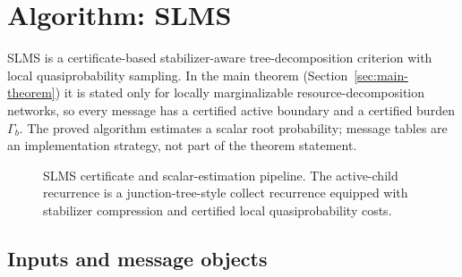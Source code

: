 \section{Algorithm: SLMS}
\label{sec:algorithm}

SLMS is a certificate-based stabilizer-aware tree-decomposition criterion with local quasiprobability sampling. In the main theorem (Section~\ref{sec:main-theorem}) it is stated only for locally marginalizable resource-decomposition networks, so every message has a certified active boundary and a certified burden \(\Gamma_b\). The proved algorithm estimates a scalar root probability; message tables are an implementation strategy, not part of the theorem statement.

\begin{figure}[t]
\centering
{}
\caption{SLMS certificate and scalar-estimation pipeline. The active-child recurrence is a junction-tree-style collect recurrence equipped with stabilizer compression and certified local quasiprobability costs.}
\label{fig:slms-pipeline}
\end{figure}

\subsection{Inputs and message objects}

